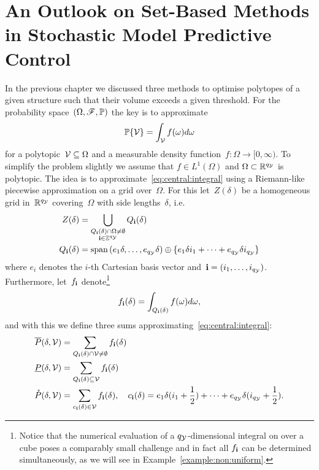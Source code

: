 \resetcounters
\chapter{An Outlook on Set-Based Methods in Stochastic Model Predictive Control}\label{ch:MPC:sec:SMPC2}

\mysplit In the previous chapter we discussed three methods to optimise polytopes of a given structure such that their volume exceeds a given threshold.
%
For the probability space~$(\Omega,\mathscr F,\mathbb P)$ the key is to approximate
%
\begin{equation}\label{eq:central:integral}
	\mathbb P\{\mathcal V\}=\int_{\mathcal V}f(\omega)d\omega
\end{equation}
%
for a polytopic~$\mathcal V\subseteq\Omega$ and a measurable density function~$f:\Omega\rightarrow[0,\infty)$.
%
To simplify the problem slightly we assume that $f\in L^1(\Omega)$ and $\Omega\subset\mathbb R^{q_\mathcal Y}$ is polytopic.
%
The idea is to approximate~\eqref{eq:central:integral} using a Riemann-like piecewise approximation on a grid over~$\Omega$.
%
For this let~$Z(\delta)$ be a homogeneous grid in~$\mathbb R^{q_\mathcal Y}$ covering~$\Omega$ with side lengths~$\delta$, i.e.
%
\begin{equation}\begin{aligned}
	Z(\delta) &= \bigcup_{\substack{Q_{\mathbf{i}}(\delta)\cap\Omega\neq\emptyset\\\mathbf{i}\in\mathbb Z^{q_\mathcal Y}}}Q_{\mathbf{i}}(\delta)\\ 
	Q_{\mathbf{i}}(\delta) &= \text{span}\left(e_1\delta,\dots,e_{q_\mathcal Y}\delta\right)\oplus\{e_1\delta i_1+\dots+e_{q_\mathcal Y}\delta i_{q_\mathcal Y}\}
\end{aligned}\end{equation}
%
where $e_i$ denotes the $i$-th Cartesian basis vector and~$\mathbf{i}=(i_1,\dots,i_{q_\mathcal Y})$.
%
Furthermore, let~$f_{\mathbf{i}}$ denote\footnote{Notice that the numerical evaluation of a $q_\mathcal Y$-dimensional integral on over a cube poses a comparably small challenge and in fact all $f_{\mathbf{i}}$ can be determined simultaneously, as we will see in Example~\ref{example:non:uniform}.}
%
\begin{equation}
	f_{\mathbf{i}}(\delta) = \int_{Q_{\mathbf{i}}(\delta)}f(\omega)d\omega,
\end{equation}
%
and with this we define three sums approximating~\eqref{eq:central:integral}:
%
\begin{equation}\label{eq:approximations:to:integral}
	\begin{aligned}
	\overline P(\delta,\mathcal V) &= \sum_{\substack{Q_{\mathbf{i}}(\delta)\cap\mathcal V\neq\emptyset}} f_{\mathbf{i}}(\delta)\\
	\underline P(\delta,\mathcal V) &= \sum_{Q_{\mathbf{i}}(\delta)\subseteq\mathcal V} f_{\mathbf{i}}(\delta)\\
	\mathring P (\delta,\mathcal V) &= \sum_{c_{\mathbf{i}}(\delta)\in\mathcal V}f_{\mathbf{i}}(\delta),\quad c_{\mathbf{i}}(\delta) = e_1\delta(i_1+\frac{1}{2})+\dots+e_{q_\mathcal Y}\delta (i_{q_\mathcal Y}+\frac{1}{2}).
	\end{aligned}
\end{equation}
